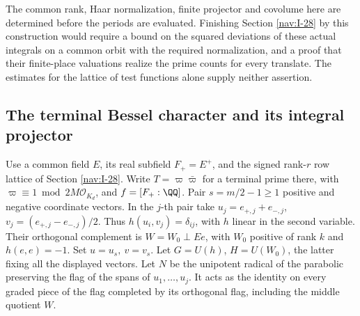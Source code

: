 \documentclass[a4paper,11pt]{article}
\theoremstyle{definition}
\theoremstyle{remark}
\numberwithin{equation}{section}
\newcommand{\OO}{\mathcal O}
\begin{document}
The common rank, Haar normalization, finite projector and covolume here are determined before the periods are evaluated. Finishing Section \ref{nav:I-28} by this construction would require a bound on the squared deviations of these actual integrals on a common orbit with the required normalization, and a proof that their finite-place valuations realize the prime counts for every translate. The estimates for the lattice of test functions alone supply neither assertion.

\subsection{The terminal Bessel character and its integral projector}\label{nav:VI-08}
\label{sec:char94}

Use a common field \(E\), its real subfield \(F_+=E^+\), and the
signed rank-\(r\) row lattice of
Section \ref{nav:I-28}.
Write \(T=\varpi\bar\varpi\) for a terminal prime there, with
\(\varpi\equiv1\bmod 2M\OO_{K_d}\), and \(f=[F_+:\QQ]\).
Pair \(s=m/2-1\ge1\) positive and negative coordinate vectors.
In the \(j\)-th pair take \(u_j=e_{+,j}+e_{-,j}\),
\(v_j=(e_{+,j}-e_{-,j})/2\). Thus \(h(u_i,v_j)=\delta_{ij}\),
with \(h\) linear in the second variable. Their orthogonal complement
is \(W=W_0\perp Ee\), with \(W_0\) positive of rank \(k\) and
\(h(e,e)=-1\). Set \(u=u_s,\ v=v_s\).
Let \(G=U(h)\), \(H=U(W_0)\), the latter fixing all the displayed
vectors. Let \(N\) be the unipotent radical of the parabolic
preserving the flag of the spans of \(u_1,\ldots,u_j\).
It acts as the identity on every graded piece of the flag completed
by its orthogonal flag, including the middle quotient \(W\).
\end{document}
